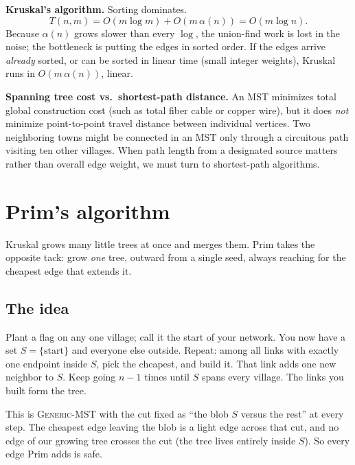 \begin{complexitybox}
\textbf{Kruskal's algorithm.} Sorting dominates.
\[ T(n,m) = O(m \log m) + O(m\,\alpha(n)) = O(m \log n). \]
Because $\alpha(n)$ grows slower than every $\log$, the union-find work is lost in
the noise; the bottleneck is putting the edges in sorted order. If the edges
arrive \emph{already} sorted, or can be sorted in linear time (small integer
weights), Kruskal runs in $O(m\,\alpha(n))$, linear.
\end{complexitybox}

\begin{trapbox}
\textbf{Spanning tree cost vs.\ shortest-path distance.}
An MST minimizes total global construction cost (such as total fiber cable or copper wire),
but it does \emph{not} minimize point-to-point travel distance between individual
vertices. Two neighboring towns might be connected in an MST only through a circuitous
path visiting ten other villages. When path length from a designated source matters
rather than overall edge weight, we must turn to shortest-path algorithms.
\end{trapbox}

\section{Prim's algorithm}

Kruskal grows many little trees at once and merges them. Prim takes the opposite
tack: grow \emph{one} tree, outward from a single seed, always reaching for the
cheapest edge that extends it.

\subsection{The idea}

\begin{intuitionbox}
Plant a flag on any one village; call it the start of your network. You now have a
set $S = \{\text{start}\}$ and everyone else outside. Repeat: among all links
with exactly one endpoint inside $S$, pick the cheapest, and build it. That link
adds one new neighbor to $S$. Keep going $n - 1$ times until $S$ spans every
village. The links you built form the tree.
\end{intuitionbox}

This is \textsc{Generic-MST} with the cut fixed as ``the blob $S$ versus the rest''
at every step. The cheapest edge leaving the blob is a light edge across that cut,
and no edge of our growing tree crosses the cut (the tree lives entirely inside
$S$). So every edge Prim adds is safe.

